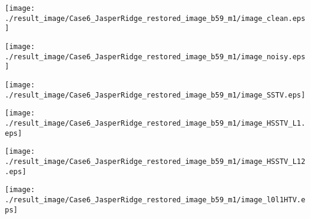 \begin{figure*}[t]
    \begin{center}
        \begin{minipage}{0.150\hsize}
            \centerline{\texttt{[image: ./result\_image/Case6\_JasperRidge\_restored\_image\_b59\_m1/image\_clean.eps]}} %
        \end{minipage}
        \begin{minipage}{0.150\hsize}
            \centerline{\texttt{[image: ./result\_image/Case6\_JasperRidge\_restored\_image\_b59\_m1/image\_noisy.eps]}} %
        \end{minipage}
        \begin{minipage}{0.150\hsize}
            \centerline{\texttt{[image: ./result\_image/Case6\_JasperRidge\_restored\_image\_b59\_m1/image\_SSTV.eps]}} %
        \end{minipage}
        \begin{minipage}{0.150\hsize}
            \centerline{\texttt{[image: ./result\_image/Case6\_JasperRidge\_restored\_image\_b59\_m1/image\_HSSTV\_L1.eps]}} %
        \end{minipage}
        \begin{minipage}{0.150\hsize}
            \centerline{\texttt{[image: ./result\_image/Case6\_JasperRidge\_restored\_image\_b59\_m1/image\_HSSTV\_L12.eps]}} %
        \end{minipage}
        \begin{minipage}{0.150\hsize}
            \centerline{\texttt{[image: ./result\_image/Case6\_JasperRidge\_restored\_image\_b59\_m1/image\_l0l1HTV.eps]}} %
        \end{minipage}
        \begin{minipage}{0.055\hsize}
            \centerline{\hspace{\hsize}} %
		\end{minipage}

        \vspace{1mm}


\end{center}
\end{figure*}
